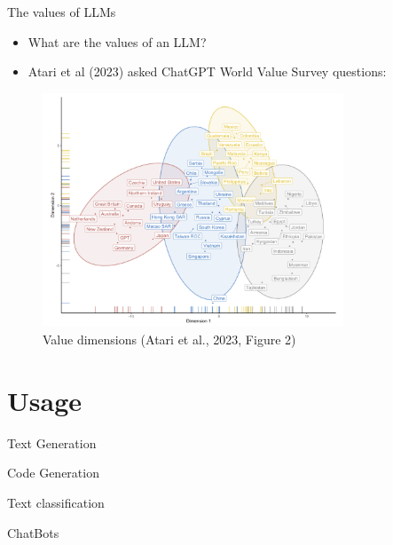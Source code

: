 \documentclass[10pt]{beamer}
\begin{document}
\begin{frame}{The values of LLMs}

\begin{itemize}
\item What are the values of an LLM?
\item Atari et al (2023) asked ChatGPT World Value Survey questions:
\end{itemize}
\pause
\begin{figure}[h]
\centering
\includegraphics[width=0.8\textwidth]{fig/atari_2023_fig2}
\caption{Value dimensions (Atari et al., 2023, Figure 2)}
\end{figure}


\end{frame}


\section{Usage}

\begin{frame}{Text Generation}

\end{frame}

\begin{frame}{Code Generation}


\end{frame}

\begin{frame}{Text classification}


\end{frame}


\begin{frame}{ChatBots}


\end{frame}
\end{document}
